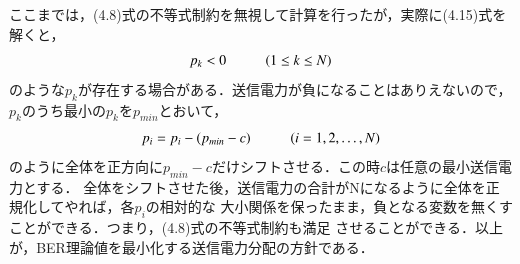 ここまでは，(4.8)式の不等式制約を無視して計算を行ったが，実際に(4.15)式を解くと，
\begin{equation}
    p_k < 0 \hspace{10mm} (1 \leq k \leq N)
\end{equation}
のような$p_k$が存在する場合がある．送信電力が負になることはありえないので，
$p_k$のうち最小の$p_k$を$p_{min}$とおいて，
\begin{equation}
    p_i = p_i-(p_{min}-c) \hspace{10mm} (i=1,2,\ldots,N)
\end{equation}
のように全体を正方向に$p_{min}-c$だけシフトさせる．この時$c$は任意の最小送信電力とする．
全体をシフトさせた後，送信電力の合計がNになるように全体を正規化してやれば，各$p_i$の相対的な
大小関係を保ったまま，負となる変数を無くすことができる．つまり，(4.8)式の不等式制約も満足
させることができる．以上が，BER理論値を最小化する送信電力分配の方針である．

